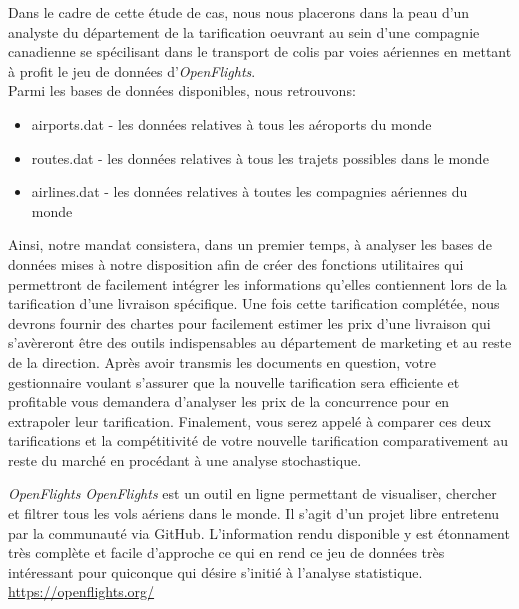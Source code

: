 Dans le cadre de cette étude de cas, nous nous placerons dans la peau d'un analyste du département de la tarification oeuvrant au sein d'une compagnie canadienne se spécilisant dans le transport de colis par voies aériennes en mettant à profit le jeu de données d'\emph{OpenFlights}. \cite{OpenFlightsData} 
 \\
Parmi les bases de données disponibles, nous retrouvons:
\begin{itemize}
	\item airports.dat - les données relatives à tous les aéroports du monde
	\item routes.dat - les données relatives à tous les trajets possibles dans le monde
	\item airlines.dat - les données relatives à toutes les compagnies aériennes du monde
\end{itemize}
\vspace{\baselineskip}
Ainsi, notre mandat consistera, dans un premier temps, à analyser les bases de données mises à notre disposition afin de créer des fonctions utilitaires qui permettront de facilement intégrer les informations qu'elles contiennent lors de la tarification d'une livraison spécifique. Une fois cette tarification complétée, nous devrons fournir des chartes pour facilement estimer les prix d'une livraison qui s'avèreront être des outils indispensables au département de marketing et au reste de la direction. Après avoir transmis les documents en question, votre gestionnaire voulant s'assurer que la nouvelle tarification sera efficiente et profitable vous demandera d'analyser les prix de la concurrence pour en extrapoler leur tarification. Finalement, vous serez appelé à comparer ces deux tarifications et la compétitivité de votre nouvelle tarification comparativement au reste du marché en procédant à une analyse stochastique.

\begin{moreInfo}{\emph{OpenFlights}}
	\emph{OpenFlights} est un outil en ligne permettant de visualiser, chercher et filtrer tous les vols aériens dans le monde. Il s'agit d'un projet libre entretenu par la communauté via GitHub. \cite{GitHub} L'information rendu disponible y est étonnament très complète et facile d'approche ce qui en rend ce jeu de données très intéressant pour quiconque qui désire s'initié à l'analyse statistique.
	\url{https://openflights.org/}
\end{moreInfo}

